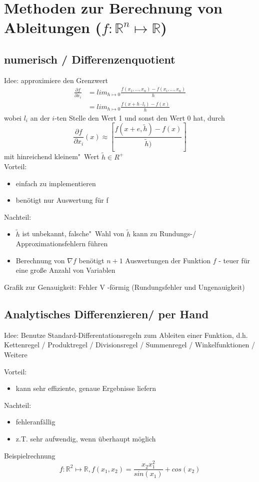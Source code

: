 \section{Methoden zur Berechnung von Ableitungen ($f: \mathbb{R}^n \mapsto \mathbb{R}$)}


\subsection{numerisch / Differenzenquotient}
\label{subsec:numerisch / Differenzenquotient}
Idee: approximiere den Grenzwert
\begin{align*}
\frac{\partial f}{\partial x_i} & = lim_{h\mapsto 0} \frac{f(x_1,\dots,x_n) - f(x_i,\dots,x_n)}{h}\\
 &= lim_{h\mapsto 0} \frac{f(x+h \cdot l_i) - f(x)}{h}
\end{align*}
wobei $l_i$ an der $i$-ten Stelle den Wert 1 und sonst den Wert 0 hat, durch 
$$\frac{\partial f}{\partial x_i}(x) \approx \left[\frac{f(x+e,\tilde h)-f(x)}{\tilde h)}\right]$$
mit \glqq hinreichend kleinem"\ Wert $\tilde h \in R^+$
\\
Vorteil:
\begin{itemize}
	\item einfach zu implementieren
	\item benötigt nur Auswertung für f
\end{itemize}
Nachteil:
\begin{itemize}
	\item $\tilde h$ ist unbekannt, \glqq falsche"\ Wahl von $\tilde h$ kann zu Rundungs-/ Approximationsfehlern führen
	\item Berechnung von $\nabla f$ benötigt $n+1$ Auswertungen der Funktion $f$ - teuer für eine große Anzahl von Variablen
\end{itemize}
\vspace{3cm}
Grafik zur Genauigkeit: Fehler V -förmig (Rundungsfehler und Ungenauigkeit)

\subsection{Analytisches Differenzieren/ per Hand}
Idee: Benutze Standard-Differentationsregeln zum Ableiten einer Funktion, d.h. Kettenregel / Produktregel / Divisionsregel / Summenregel / Winkelfunktionen / Weitere

\noindent Vorteil:
\begin{itemize}
	\item kann sehr effiziente, genaue Ergebnisse liefern
\end{itemize}
Nachteil:
\begin{itemize}
	\item fehleranfällig
	\item z.T. sehr aufwendig, wenn überhaupt möglich
\end{itemize}
Beispielrechnung
$$f:\mathbb{R}^2\mapsto\mathbb{R}, f(x_1,x_2) = \frac{x_2 x_1^2}{sin(x_1)}+cos(x_2)$$

